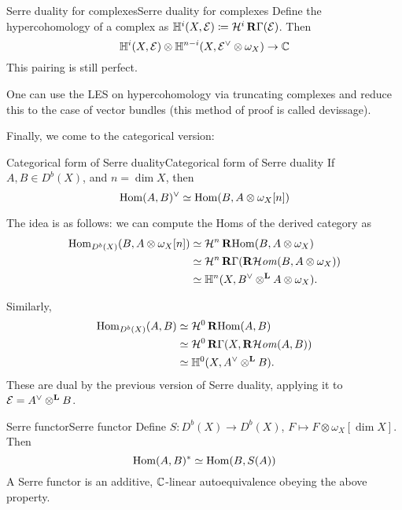 
\begin{proposition}{Serre duality for complexes}{Serre duality for complexes}
    Define the hypercohomology of a complex as $\mathbb{H}^i(X,\mathcal{E})\coloneqq\mathcal{H}^i\operatorname{\mathbf{R}\Gamma}(\mathcal{E})$. Then
    \begin{equation*}
        \mathbb{H}^i(X,\mathcal{E})\otimes\mathbb{H}^{n-i}(X,\mathcal{E}^\vee\otimes\omega_X)\to\mathbb{C}
    \end{equation*}
    This pairing is still perfect.
\end{proposition}

One can use the LES on hypercohomology via truncating complexes and reduce this to the case of vector bundles (this method of proof is called devissage).

Finally, we come to the categorical version:

\begin{proposition}{Categorical form of Serre duality}{Categorical form of Serre duality}
    If $A,B\in D^b(X)$, and $n=\dim X$, then
    \begin{equation*}
        \operatorname{Hom}(A,B)^\vee \simeq \operatorname{Hom}(B,A\otimes\omega_X[n])
    \end{equation*}
\end{proposition}

The idea is as follows: we can compute the Homs of the derived category as
\begin{align*}
    \operatorname{Hom}_{D^b(X)}(B,A\otimes\omega_X[n])
        &\simeq \mathcal{H}^n\operatorname{\mathbf{R} Hom}(B,A\otimes\omega_X) \\
        &\simeq \mathcal{H}^n\operatorname{\mathbf{R}\Gamma}(\operatorname{\mathbf{R}\mathcal{H}\mathit{om}}(B,A\otimes\omega_X)) \\
        &\simeq \mathbb{H}^n(X,B^\vee\otimes^{\mathbf{L}} A\otimes\omega_X).
\end{align*}

Similarly,
\begin{align*}
    \operatorname{Hom}_{D^b(X)}(A,B)
        &\simeq \mathcal{H}^0\operatorname{\mathbf{R} Hom}(A,B) \\
        &\simeq \mathcal{H}^0\operatorname{\mathbf{R}\Gamma}(X,\operatorname{\mathbf{R}\mathcal{H}\mathit{om}}(A,B)) \\
        &\simeq \mathbb{H}^0(X,A^\vee\otimes^{\mathbf{L}} B).
\end{align*}
These are dual by the previous version of Serre duality, applying it to $\mathcal{E}=A^\vee\otimes^{\mathbf{L}} B$.

\begin{definition}{Serre functor}{Serre functor}
    Define $S:D^b(X)\to D^b(X)$, $F\mapsto F\otimes\omega_X[\dim X]$. Then
    \begin{equation*}
        \operatorname{Hom}(A,B)^*\simeq\operatorname{Hom}(B,S(A))
    \end{equation*}
     A Serre functor is an additive, $\mathbb{C}$-linear autoequivalence obeying the above property.
\end{definition}

